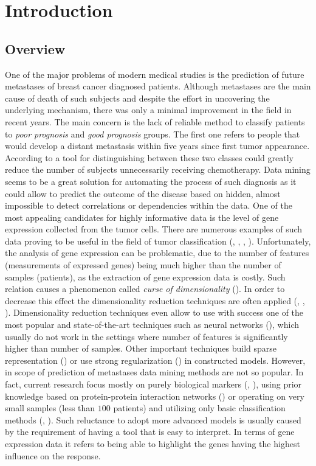 \documentclass[shortabstract, english, mgr]{iithesis}
\author{Stanisław Wilczyński}
\begin{document}
\chapter{Introduction} \label{section:intro}

\section{Overview}
One of the major problems of modern medical studies is the prediction of future metastases of breast cancer diagnosed patients. Although metastases are the main cause of death of such subjects and despite the effort in uncovering the underlying mechanism, there was only a minimal improvement in the field in recent years. The main concern is the lack of reliable method to classify patients to \textit{poor prognosis} and \textit{good prognosis} groups. The first one refers to people that would develop a distant metastasis within five years since first tumor appearance. According to \cite{Metastasis1} a tool for distinguishing between these two classes could greatly reduce the number of subjects unnecessarily receiving chemotherapy. Data mining seems to be a great solution for automating the process of such diagnosis as it could allow to predict the outcome of the disease based on hidden, almost impossible to detect correlations or dependencies within the data. One of the most appealing candidates for highly informative data is the level of gene expression collected from the tumor cells. There are numerous examples of such data proving to be useful in the field of tumor classification (\cite{BreastCancerClassification}, \cite{TumorMolecularClass}, \cite{TumorsClass1}, \cite{TumorClass2}). Unfortunately, the analysis of gene expression can be problematic, due to the number of features (measurements of expressed genes) being much higher than the number of samples (patients), as the extraction of gene expression data is costly. Such relation causes a phenomenon called \textit{curse of dimensionality} (\cite[p. 22-26]{ESL2}). In order to decrease this effect the dimensionality reduction techniques are often applied (\cite{MasterArts}, \cite{TumorClass4}, \cite{TumorPLS}). Dimensionality reduction techniques even allow to use with success one of the most popular and state-of-the-art techniques such as neural networks (\cite{fDNN}), which usually do not work in the settings where number of features is significantly higher than number of samples. Other important techniques build sparse representation (\cite{TumorClass3}) or use strong regularization (\cite[p. 649-666]{ESL2}) in constructed models. However, in scope of prediction of metastases data mining methods are not so popular. In fact, current research focus mostly on purely biological markers (\cite{Metastasis4}, \cite{dataOrigin}), using prior knowledge based on protein-protein interaction networks (\cite{MetastasisScores}) or operating on very small samples (less than $100$ patients) and utilizing only basic classification methods (\cite{Metastasis1}, \cite{Metastasis2}). Such reluctance to adopt more advanced models is usually caused by the requirement of having a tool that is easy to interpret. In terms of gene expression data it refers to being able to highlight the genes having the highest influence on the response.
\end{document}
